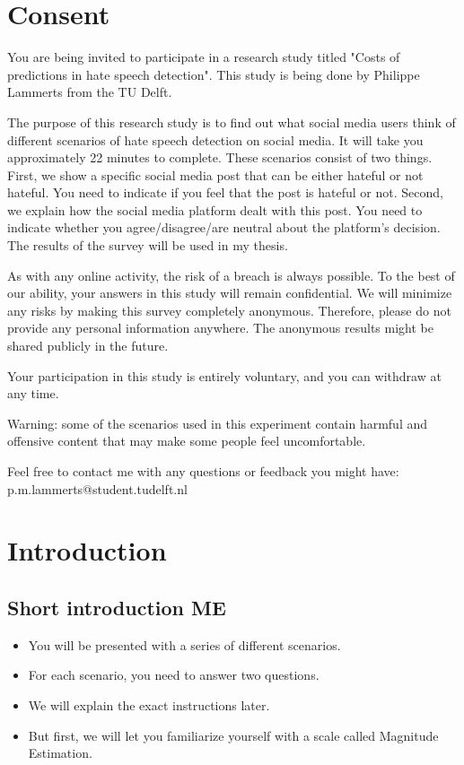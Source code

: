 \section{Consent}
\begin{flushleft}
    You are being invited to participate in a research study titled "Costs of predictions in hate speech detection". This study is being done by Philippe Lammerts from the TU Delft.
\end{flushleft}
\begin{flushleft}
    The purpose of this research study is to find out what social media users think of different scenarios of hate speech detection on social media. It will take you approximately 22 minutes to complete. These scenarios consist of two things. First, we show a specific social media post that can be either hateful or not hateful. You need to indicate if you feel that the post is hateful or not. Second,  we explain how the social media platform dealt with this post. You need to indicate whether you agree/disagree/are neutral about the platform's decision. The results of the survey will be used in my thesis.
\end{flushleft}
\begin{flushleft}
    As with any online activity, the risk of a breach is always possible. To the best of our ability, your answers in this study will remain confidential. We will minimize any risks by making this survey completely anonymous. Therefore, please do not provide any personal information anywhere. The anonymous results might be shared publicly in the future.
\end{flushleft}
\begin{flushleft}
    Your participation in this study is entirely voluntary, and you can withdraw at any time.
\end{flushleft}
\begin{flushleft}
    Warning: some of the scenarios used in this experiment contain harmful and offensive content that may make some people feel uncomfortable.
\end{flushleft}
\begin{flushleft}
    Feel free to contact me with any questions or feedback you might have:
    p.m.lammerts@student.tudelft.nl
\end{flushleft}

\section{Introduction}
\subsection{Short introduction ME}
\begin{itemize}
    \item You will be presented with a series of different scenarios.
    \item For each scenario, you need to answer two questions.
    \item We will explain the exact instructions later.
    \item But first, we will let you familiarize yourself with a scale called Magnitude Estimation.
\end{itemize}

